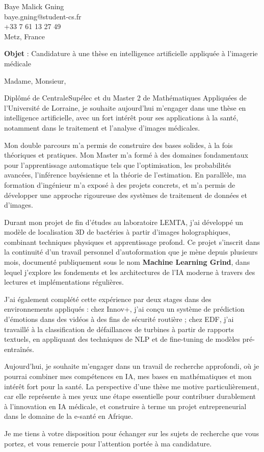 
\begin{flushright}
Baye Malick Gning\\
baye.gning@student-cs.fr\\
+33 7 61 13 27 49\\
Metz, France
\end{flushright}

\vspace{1cm}

\noindent
\textbf{Objet} : Candidature à une thèse en intelligence artificielle appliquée à l’imagerie médicale

\vspace{0.5cm}

Madame, Monsieur,

Diplômé de CentraleSupélec et du Master 2 de Mathématiques Appliquées de l’Université de Lorraine, je souhaite aujourd’hui m’engager dans une thèse en intelligence artificielle, avec un fort intérêt pour ses applications à la santé, notamment dans le traitement et l’analyse d’images médicales.

Mon double parcours m’a permis de construire des bases solides, à la fois théoriques et pratiques. Mon Master m’a formé à des domaines fondamentaux pour l’apprentissage automatique tels que l’optimisation, les probabilités avancées, l’inférence bayésienne et la théorie de l’estimation. En parallèle, ma formation d’ingénieur m’a exposé à des projets concrets, et m’a permis de développer une approche rigoureuse des systèmes de traitement de données et d’images.

Durant mon projet de fin d’études au laboratoire LEMTA, j’ai développé un modèle de localisation 3D de bactéries à partir d’images holographiques, combinant techniques physiques et apprentissage profond. Ce projet s’inscrit dans la continuité d’un travail personnel d’autoformation que je mène depuis plusieurs mois, documenté publiquement sous le nom \textbf{Machine Learning Grind}, dans lequel j’explore les fondements et les architectures de l’IA moderne à travers des lectures et implémentations régulières.

J’ai également complété cette expérience par deux stages dans des environnements appliqués : chez Innov+, j’ai conçu un système de prédiction d’émotions dans des vidéos à des fins de sécurité routière ; chez EDF, j’ai travaillé à la classification de défaillances de turbines à partir de rapports textuels, en appliquant des techniques de NLP et de fine-tuning de modèles pré-entraînés.

Aujourd’hui, je souhaite m’engager dans un travail de recherche approfondi, où je pourrai combiner mes compétences en IA, mes bases en mathématiques et mon intérêt fort pour la santé. La perspective d’une thèse me motive particulièrement, car elle représente à mes yeux une étape essentielle pour contribuer durablement à l’innovation en IA médicale, et construire à terme un projet entrepreneurial dans le domaine de la e-santé en Afrique.

Je me tiens à votre disposition pour échanger sur les sujets de recherche que vous portez, et vous remercie pour l’attention portée à ma candidature.
